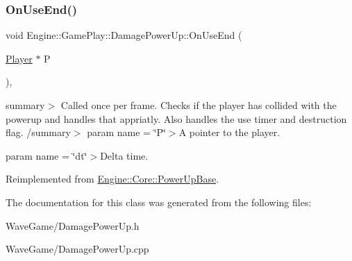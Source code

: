 \subsubsection{\texorpdfstring{On\+Use\+End()}{OnUseEnd()}}
{\footnotesize\ttfamily void Engine\+::\+Game\+Play\+::\+Damage\+Power\+Up\+::\+On\+Use\+End (\begin{DoxyParamCaption}\item[{\hyperlink{class_engine_1_1_game_play_1_1_player}{Player} $\ast$}]{P }\end{DoxyParamCaption})\hspace{0.3cm}{\ttfamily [override]}, {\ttfamily [virtual]}}

summary$>$ Called once per frame. Checks if the player has collided with the powerup and handles that appriatly. Also handles the use timer and destruction flag. /summary$>$ param name = \char`\"{}\+P\char`\"{}$>$A pointer to the player.

param name = \char`\"{}dt\char`\"{}$>$Delta time.

Reimplemented from \hyperlink{class_engine_1_1_core_1_1_power_up_base_a195aecea60afdb99add60661a1c95697}{Engine\+::\+Core\+::\+Power\+Up\+Base}.



The documentation for this class was generated from the following files\+:\begin{DoxyCompactItemize}
\item 
Wave\+Game/Damage\+Power\+Up.\+h\item 
Wave\+Game/Damage\+Power\+Up.\+cpp\end{DoxyCompactItemize}
